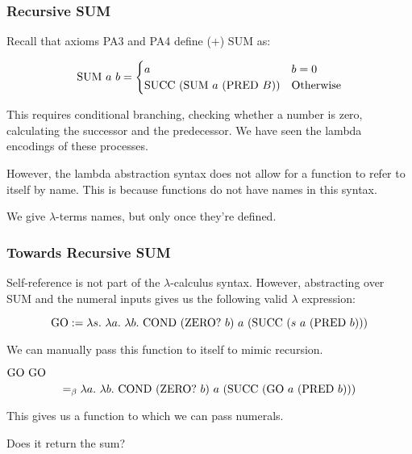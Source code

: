 \documentclass{beamer}
\begin{document}
\begin{frame}
  \frametitle{Recursive SUM}

	Recall that axioms PA3 and PA4 define ($+$) SUM as: 

  $$\text{SUM} \ a \ b = 
  \begin{cases}
    a & b = 0 \\
    \text{SUCC} \ (\text{SUM} \ a \ (\text{PRED} \ B)) & \text{Otherwise}
  \end{cases} $$

  This requires conditional branching, checking whether a number is zero, calculating the successor and the predecessor. We have seen the lambda encodings of these processes.

  \vspace{0.2cm}

  However, the lambda abstraction syntax does not allow for a function to refer to itself by name. This is because functions do not have names in this syntax. 

  \vspace{0.2cm}

  We give $\lambda$-terms names, but only once they're defined. 

\end{frame}

\begin{frame}
	\frametitle{Towards Recursive SUM}

	Self-reference is not part of the $\lambda$-calculus syntax. However, abstracting over SUM and the numeral inputs gives us the following valid $\lambda$ expression: 

	$$\GO := \lambda s. \ \lambda a. \ \lambda b. \ \COND \ (\ISITZERO \ b) \ a \ (\SUCC \ (s \ a \ (\PRED \ b))) $$

	We can manually pass this function to itself to mimic recursion. 
	
	$\text{GO} \ \text{GO} $
	$$=_{\beta} \lambda a. \ \lambda b. \ \COND \ (\ISITZERO \ b) \ a \ (\SUCC \ (\GO \ a \ (\PRED \ b))) $$

	This gives us a function to which we can pass numerals. 
	
	Does it return the sum?


\end{frame}
\end{document}
